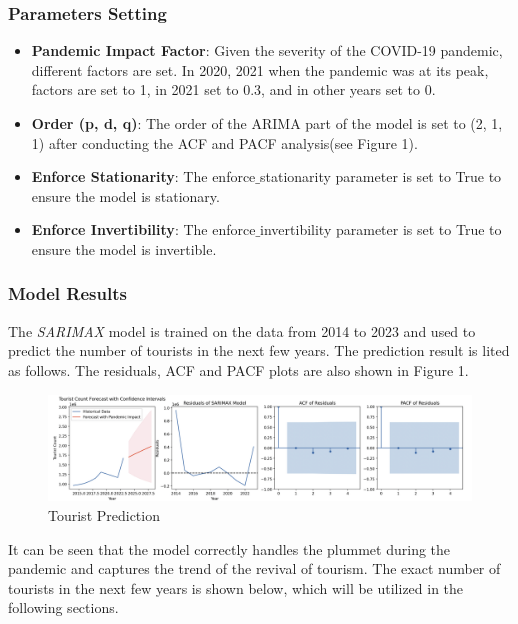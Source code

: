 \subsubsection{Parameters Setting}

\begin{itemize}
    \item \textbf{Pandemic Impact Factor}: Given the severity of the COVID-19 pandemic, different factors are set.
    In 2020, 2021 when the pandemic was at its peak, factors are set to 1, in 2021 set to 0.3, and in other years set to 0.
    \item \textbf{Order (p, d, q)}: The order of the ARIMA part of the model is set to (2, 1, 1) after conducting the ACF and PACF analysis(see Figure 1).
    \item \textbf{Enforce Stationarity}: The enforce$\_$stationarity parameter is set to True to ensure the model is stationary.
    \item \textbf{Enforce Invertibility}: The enforce$\_$invertibility parameter is set to True to ensure the model is invertible.
\end{itemize}

\subsubsection{Model Results}

The \textit{SARIMAX} model is trained on the data from 2014 to 2023 
and used to predict the number of tourists in the next few years.
The prediction result is lited as follows. The residuals, ACF and PACF plots are 
also shown in Figure 1.

\begin{figure}[H]
    \centering
    \includegraphics[width=1\textwidth]{Fig_Tourists.png} %
    \vspace{-0.4cm}
    \caption{Tourist Prediction}
\end{figure}

It can be seen that the model correctly handles the plummet during the pandemic and
captures the trend of the revival of tourism. The exact number of 
tourists in the next few years is shown below, which will be utilized in the following sections.

